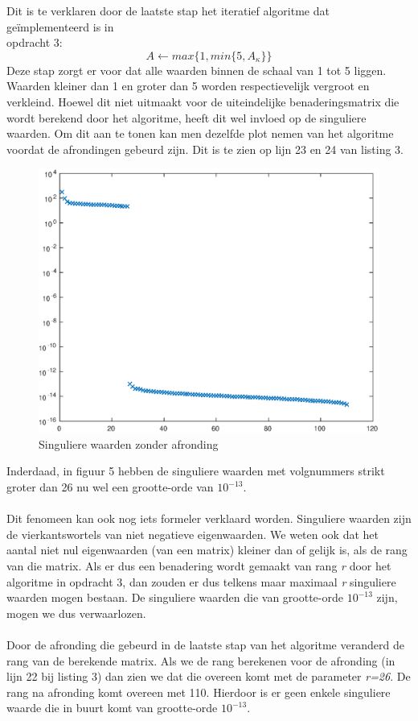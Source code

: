 \documentclass[11pt,a4paper]{article}
\begin{document}
Dit is te verklaren door de laatste stap het iteratief algoritme dat geïmplementeerd is in \\opdracht 3:
$$A \leftarrow max\{1,min\{5,A_{\kappa}\}\}$$
Deze stap zorgt er voor dat alle waarden binnen de schaal van 1 tot 5 liggen. Waarden kleiner dan 1 en groter dan 5 worden respectievelijk vergroot en verkleind. Hoewel dit niet uitmaakt voor de uiteindelijke benaderingsmatrix die wordt berekend door het algoritme, heeft dit wel invloed op de singuliere waarden. Om dit aan te tonen kan men dezelfde plot nemen van het algoritme voordat de afrondingen gebeurd zijn. Dit is te zien op lijn 23 en 24 van listing 3. 
\begin{figure}[H]
\centering
\includegraphics[scale=0.55]{opdracht9b}
\caption{Singuliere waarden zonder afronding}
\end{figure}
Inderdaad, in figuur 5 hebben de singuliere waarden met volgnummers strikt groter dan 26 nu wel een grootte-orde van $10^{-13}$.\\
\\
Dit fenomeen kan ook nog iets formeler verklaard worden. Singuliere waarden zijn de vierkantswortels van niet negatieve eigenwaarden. We weten ook dat het aantal niet nul eigenwaarden (van een matrix) kleiner dan of gelijk is, als de rang van die matrix.
Als er dus een benadering wordt gemaakt van rang \textit{r} door het algoritme in opdracht 3, dan zouden er dus telkens maar maximaal \textit{r} singuliere waarden mogen bestaan. De singuliere waarden die van grootte-orde $10^{-13}$ zijn, mogen we dus verwaarlozen.
\\
\\
Door de afronding die gebeurd in de laatste stap van het algoritme veranderd de rang van de berekende matrix. Als we de rang berekenen voor de afronding (in lijn 22 bij listing 3) dan zien we dat die overeen komt met de parameter \textit{r=26}. De rang na afronding komt overeen met 110. Hierdoor is er geen enkele singuliere waarde die in buurt komt van grootte-orde $10^{-13}$.
\end{document}
